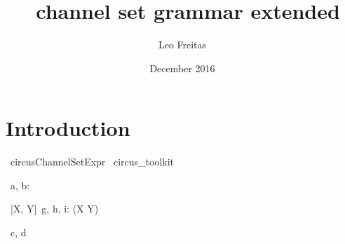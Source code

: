 \documentclass{article}
\begin{document}
\title{\Circus\ channel set grammar extended}
\author{Leo Freitas}
\date{December 2016}

\maketitle

\section{Introduction}

\begin{zsection}
  \SECTION\ circusChannelSetExpr \parents\ circus\_toolkit
\end{zsection}

%
\begin{circus}
  \circchannel\ a, b: \nat
\end{circus}%
%
\begin{circus}
   \circchannel\ [X, Y]\ g, h, i: (X \rel Y)
\end{circus}

\begin{circus}
   \circchannel\ c, d 
\end{circus}%


%
%
%
%
%
%
%
%
%
\end{document}
